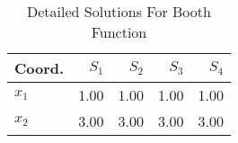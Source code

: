 \begin{table}
\centering
\caption{Detailed Solutions For Booth Function}
\label{detailedsolutions:booth}
\begin{tabular}{lrrrr}
\toprule
 Coord. &  $S_{1}$ &  $S_{2}$ &  $S_{3}$ &  $S_{4}$ \\
\midrule
$x_{1}$ &     1.00 &     1.00 &     1.00 &     1.00 \\
$x_{2}$ &     3.00 &     3.00 &     3.00 &     3.00 \\
\bottomrule
\end{tabular}
\end{table}

